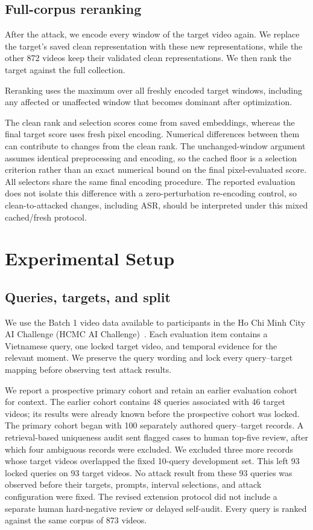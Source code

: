 \documentclass[runningheads]{llncs}
\begin{document}
\subsection{Full-corpus reranking}
\label{sec:reranking}

After the attack, we encode every window of the target video again. We replace the target's saved clean representation with these new representations, while the other 872 videos keep their validated clean representations. We then rank the target against the full collection.

Reranking uses the maximum over all freshly encoded target windows, including any affected or unaffected window that becomes dominant after optimization.

The clean rank and selection scores come from saved embeddings, whereas the final target score uses fresh pixel encoding. Numerical differences between them can contribute to changes from the clean rank. The unchanged-window argument assumes identical preprocessing and encoding, so the cached floor is a selection criterion rather than an exact numerical bound on the final pixel-evaluated score. All selectors share the same final encoding procedure. The reported evaluation does not isolate this difference with a zero-perturbation re-encoding control, so clean-to-attacked changes, including ASR, should be interpreted under this mixed cached/fresh protocol.

\section{Experimental Setup}

\subsection{Queries, targets, and split}
\label{sec:queries-split}

We use the Batch 1 video data available to participants in the Ho Chi Minh City AI Challenge (HCMC AI Challenge)~\cite{hcmcaic}. Each evaluation item contains a Vietnamese query, one locked target video, and temporal evidence for the relevant moment. We preserve the query wording and lock every query--target mapping before observing test attack results.

We report a prospective primary cohort and retain an earlier evaluation cohort for context. The earlier cohort contains 48 queries associated with 46 target videos; its results were already known before the prospective cohort was locked. The primary cohort began with 100 separately authored query--target records. A retrieval-based uniqueness audit sent flagged cases to human top-five review, after which four ambiguous records were excluded. We excluded three more records whose target videos overlapped the fixed 10-query development set. This left 93 locked queries on 93 target videos. No attack result from these 93 queries was observed before their targets, prompts, interval selections, and attack configuration were fixed. The revised extension protocol did not include a separate human hard-negative review or delayed self-audit. Every query is ranked against the same corpus of 873 videos.
\end{document}
